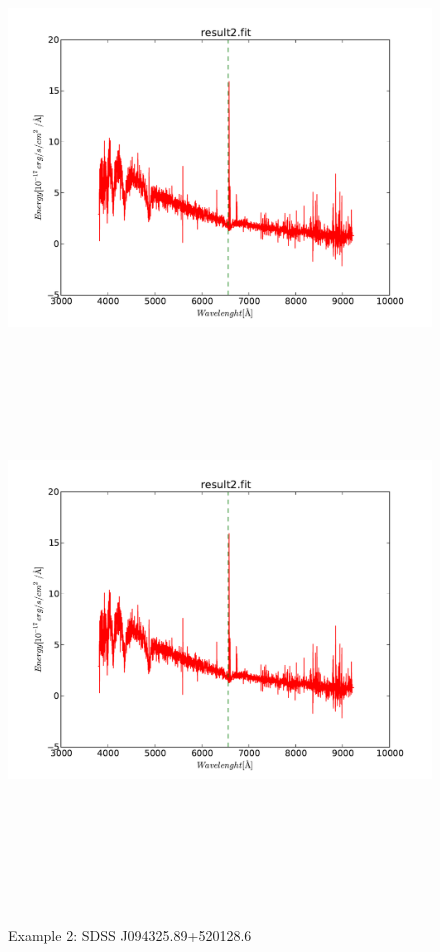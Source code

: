    \begin{figure}[!htbp]
      \begin{center}
        \leavevmode
        \ifpdf
        \includegraphics[scale =.6]{result2}
        \else
        \includegraphics[bb = 92 86 545 742, height=6in]{result2}
        \fi
        \caption{Example 2: SDSS J094325.89+520128.6}
        \label{FigResult2}
      \end{center}
    \end{figure}

